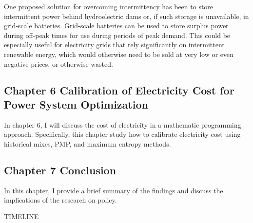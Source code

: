One proposed solution for overcoming intermittency has been to store
intermittent power behind hydroelectric dams or, if such storage is
unavailable, in grid-scale batteries. Grid-scale batteries can be used
to store surplus power during off-peak times for use during periods of
peak demand. This could be especially useful for electricity grids that
rely significantly on intermittent renewable energy, which would
otherwise need to be sold at very low or even negative prices, or
otherwise wasted.

\subsection{Chapter 6 Calibration of Electricity Cost for Power System
Optimization
}\label{chapter-6-calibration-of-electricity-cost-for-power-system-optimization}

In chapter 6, I will discuss the cost of electricity in a mathematic
programming approach. Specifically, this chapter study how to calibrate
electricity cost using historical mixes, PMP, and maximum entropy
methods.

\subsection{Chapter 7 Conclusion }\label{chapter-7-conclusion}

In this chapter, I provide a brief summary of the findings and discuss
the implications of the research on policy.

TIMELINE